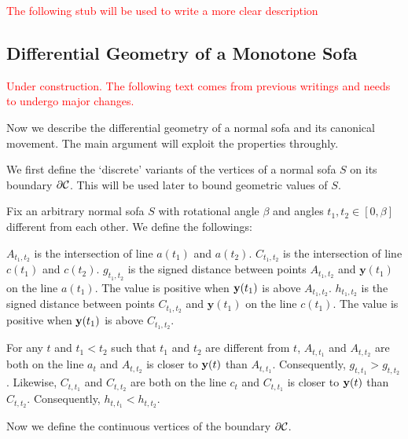 \textcolor{red}{The following stub will be used to write a more clear description}

\subsection{Differential Geometry of a Monotone Sofa}
\textcolor{red}{Under construction. The following text comes from previous writings and needs to undergo major changes.}

Now we describe the differential geometry of a normal sofa and its canonical movement.
The main argument will exploit the properties throughly.

We first define the `discrete' variants of the vertices of a normal sofa $S$ on its boundary $\partial \mathcal{C}$. This will be used later to bound geometric values of $S$.
\begin{definition}
Fix an arbitrary normal sofa $S$ with rotational angle $\beta$ and angles $t_1, t_2 \in [0, \beta]$ different from each other. We define the followings:

$A_{t_1, t_2}$ is the intersection of line $a(t_1)$ and $a(t_2)$.
$C_{t_1, t_2}$ is the intersection of line $c(t_1)$ and $c(t_2)$.
$g_{t_1, t_2}$ is the signed distance between points $A_{t_1, t_2}$ and $\mathbf{y}(t_1)$ on the line $a(t_1)$.
The value is positive when $\mathbf{y}(t_1)$ is above $A_{t_1, t_2}$. 
$h_{t_1, t_2}$ is the signed distance between points $C_{t_1, t_2}$ and $\mathbf{y}(t_1)$ on the line $c(t_1)$.
The value is positive when $\mathbf{y}(t_1)$ is above $C_{t_1, t_2}$.
\end{definition}

\begin{proposition}
\label{prop:disc-leg-len}
For any $t$ and $t_1 < t_2$ such that $t_1$ and $t_2$ are different from $t$,
$A_{t, t_1}$ and $A_{t, t_2}$ are both on the line $a_{t}$ and $A_{t, t_2}$ is closer to $\mathbf{y}(t)$ than $A_{t, t_1}$. 
Consequently, $g_{t, t_1} > g_{t, t_2}$.
Likewise, $C_{t, t_1}$ and $C_{t, t_2}$ are both on the line $c_{t}$ and $C_{t, t_1}$ is closer to $\mathbf{y}(t)$ than $C_{t, t_2}$. 
Consequently, $h_{t, t_1} < h_{t, t_2}$.
\end{proposition}

Now we define the continuous vertices of the boundary $\partial \mathcal{C}$.

